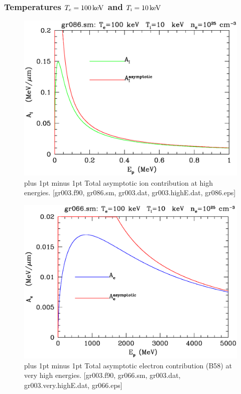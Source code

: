 \documentclass[preprint,12pt,eqsecnum,nofootinbib,amsmath,amssymb]{revtex4}
\newcommand{\smI}{{\rm\scriptscriptstyle I}}
\newcommand{\footnoteskip}{\baselineskip 12pt plus 1pt minus 1pt}
\begin{document}
\pagebreak
\subsubsection{Temperatures $T_e=100\,{\rm keV}$ and $T_\smI=10\,{\rm keV}$}

\vskip-2cm 
\begin{figure}[h!]
\includegraphics[scale=0.45]{gr086.eps} 
\vskip-0.8cm 
\caption{\footnoteskip  
  Total asymptotic ion contribution at high energies. [gr003.f90,
  gr086.sm, gr003.dat, gr003.highE.dat, gr086.eps] 
}
\label{fig:gr086}
\end{figure}

\vskip-2cm 
\begin{figure}[h!]
\includegraphics[scale=0.45]{gr066.eps}
\vskip-0.8cm 
\caption{\footnoteskip  
  Total asymptotic electron contribution (B58) at very high
  energies. [gr003.f90, gr066.sm, gr003.dat, gr003.very.highE.dat,
  gr066.eps] 
}
\label{fig:gr066}
\end{figure}
\end{document}
